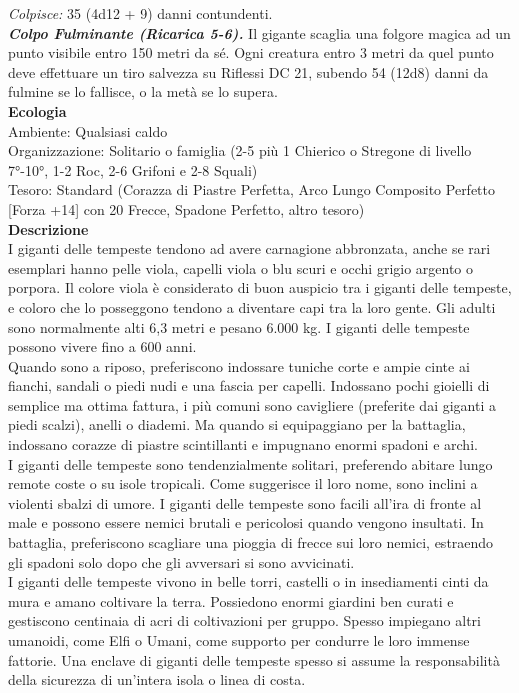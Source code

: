 \begin{multicols}{2}
\emph{Colpisce:} 35 (4d12 + 9) danni contundenti.\\
\emph{\textbf{Colpo Fulminante (Ricarica 5-6).}} Il gigante scaglia una folgore magica ad un punto visibile entro 150 metri da sé. Ogni creatura entro 3 metri da quel punto deve effettuare un tiro salvezza su Riflessi DC  21, subendo 54 (12d8) danni da fulmine se lo fallisce, o la metà se lo supera.\\
\textbf{Ecologia}\\
Ambiente: Qualsiasi caldo\\
Organizzazione: Solitario o famiglia (2-5 più 1 Chierico o Stregone di livello 7°-10°, 1-2 Roc, 2-6 Grifoni e 2-8 Squali)\\
Tesoro: Standard (Corazza di Piastre Perfetta, Arco Lungo Composito Perfetto [Forza +14] con 20 Frecce, Spadone Perfetto, altro tesoro)\\
\textbf{Descrizione}\\
I giganti delle tempeste tendono ad avere carnagione abbronzata, anche se rari esemplari hanno pelle viola, capelli viola o blu scuri e occhi grigio argento o porpora. Il colore viola è considerato di buon auspicio tra i giganti delle tempeste, e coloro che lo posseggono tendono a diventare capi tra la loro gente. Gli adulti sono normalmente alti 6,3 metri e pesano 6.000 kg. I giganti delle tempeste possono vivere fino a 600 anni.\\

Quando sono a riposo, preferiscono indossare tuniche corte e ampie cinte ai fianchi, sandali o piedi nudi e una fascia per capelli. Indossano pochi gioielli di semplice ma ottima fattura, i più comuni sono cavigliere (preferite dai giganti a piedi scalzi), anelli o diademi. Ma quando si equipaggiano per la battaglia, indossano corazze di piastre scintillanti e impugnano enormi spadoni e archi.\\

I giganti delle tempeste sono tendenzialmente solitari, preferendo abitare lungo remote coste o su isole tropicali. Come suggerisce il loro nome, sono inclini a violenti sbalzi di umore. I giganti delle tempeste sono facili all'ira di fronte al male e possono essere nemici brutali e pericolosi quando vengono insultati. In battaglia, preferiscono scagliare una pioggia di frecce sui loro nemici, estraendo gli spadoni solo dopo che gli avversari si sono avvicinati.\\

I giganti delle tempeste vivono in belle torri, castelli o in insediamenti cinti da mura e amano coltivare la terra. Possiedono enormi giardini ben curati e gestiscono centinaia di acri di coltivazioni per gruppo. Spesso impiegano altri umanoidi, come Elfi o Umani, come supporto per condurre le loro immense fattorie. Una enclave di giganti delle tempeste spesso si assume la responsabilità della sicurezza di un’intera isola o linea di costa.\\


\end{multicols}
